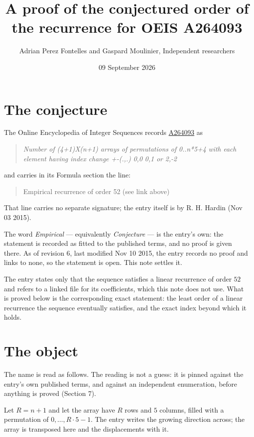 \documentclass[11pt]{article}
\title{A proof of the conjectured order of the recurrence for OEIS A264093}
\author{Adrian Perez Fontelles and Gaspard Moulinier, Independent researchers}
\date{09 September 2026}
\theoremstyle{definition}
\begin{document}
\maketitle
\section{The conjecture}

The Online Encyclopedia of Integer Sequences records \href{https://oeis.org/A264093}{A264093} as

\begin{quote}\itshape Number of (4+1)X(n+1) arrays of permutations of 0..n*5+4 with each element having index change +-(.,.) 0,0 0,1 or 2,-2\end{quote}

and carries in its Formula section the line:

\begin{quote}\ttfamily Empirical recurrence of order 52 (see link above)\end{quote}

That line carries no separate signature; the entry itself is by R. H. Hardin (Nov 03 2015).

The word {\itshape Empirical} --- equivalently {\itshape Conjecture} --- is the entry's own: the statement is recorded as fitted to the published terms, and no proof is given there. As of revision 6, last modified Nov 10 2015, the entry records no proof and links to none, so the statement is open. This note settles it.

The entry states only that the sequence satisfies a linear recurrence of order $52$ and refers to a linked file for its coefficients, which this note does not use. What is proved below is the corresponding exact statement: the least order of a linear recurrence the sequence eventually satisfies, and the exact index beyond which it holds.

\section{The object}

The name is read as follows. The reading is not a guess: it is pinned against the entry's own published terms, and against an independent enumeration, before anything is proved (Section 7).

Let $R = n + 1$ and let the array have $R$ rows and $5$ columns, filled with a permutation of $0,\dots,R\cdot5-1$. The entry writes the growing direction across; the array is transposed here and the displacements with it.
\end{document}
